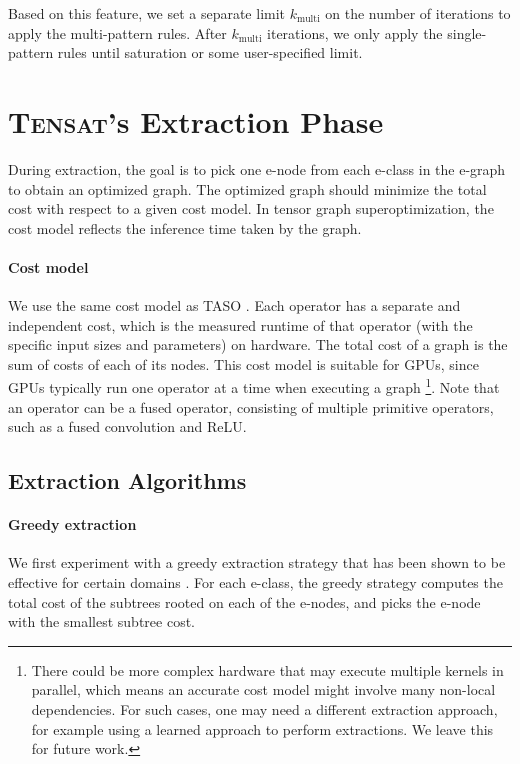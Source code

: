\documentclass{article}
\newcommand{\ourname}[0]{\textsc{Tensat}}
\begin{document}
Based on this feature, we set a separate limit $k_{\textrm{multi}}$ on the number of iterations to apply the multi-pattern rules. 
After $k_{\textrm{multi}}$ iterations, we only apply the single-pattern rules until saturation or some user-specified limit. 


\section{\ourname{}'s Extraction Phase}

During extraction, the goal is to pick one e-node from each e-class in the e-graph to obtain an optimized graph. 
The optimized graph should minimize the total cost with respect to a given cost model. 
In tensor graph superoptimization, the cost model reflects the inference time taken by the graph. 

\paragraph{Cost model}
We use the same cost model as TASO \cite{taso}. 
Each operator has a separate and independent cost, which is the measured runtime of that operator (with the specific input sizes and parameters) on hardware. 
The total cost of a graph is the sum of costs of each of its nodes. 
This cost model is suitable for GPUs, since GPUs typically run one operator at a time when executing a graph \footnote{There could be more complex hardware that may execute multiple kernels in parallel, which means an accurate cost model might involve many non-local dependencies. For such cases, one may need a different extraction approach, for example using a learned approach to perform extractions. We leave this for future work.}. 
Note that an operator can be a fused operator, consisting of multiple primitive operators, such as a fused convolution and ReLU.

\subsection{Extraction Algorithms}
\label{sec:extraction}

\paragraph{Greedy extraction}

We first experiment with a greedy extraction strategy that has been shown to be effective for certain domains \cite{herbie, spores, egg}. 
For each e-class, the greedy strategy computes the total cost of the subtrees rooted on each of the e-nodes, and picks the e-node with the smallest subtree cost. 
\end{document}
